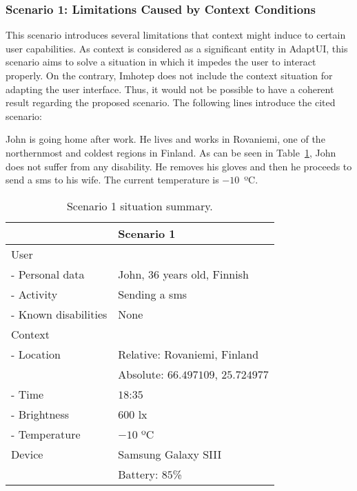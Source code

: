\subsubsection{Scenario 1: Limitations Caused by Context Conditions}
\label{sec:scenario1}

This scenario introduces several limitations that context might induce to 
certain user capabilities. As context is considered as a significant entity in 
AdaptUI, this scenario aims to solve a situation in which it impedes the user to
interact properly. On the contrary, Imhotep does not include the context 
situation for adapting the user interface. Thus, it would not be possible to 
have a coherent result regarding the proposed scenario. The following 
lines introduce the cited scenario:

John is going home after work. He lives and works in Rovaniemi, one of the
northernmost and coldest regions in Finland. As can be seen in 
Table~\ref{tbl:scenario1}, John does not suffer from any disability. He removes
his gloves and then he proceeds to send a \ac{sms} to his wife. The current 
temperature is $-10$~ºC.

\begin{table}
 \caption{Scenario 1 situation summary.}
 \label{tbl:scenario1}
 \footnotesize
 \centering
\begin{tabular}{l l}
  \hline 
				& \textbf{Scenario 1} 		\\
  \hline
  User \\
  \qquad - Personal data 	& John, $36$ years old, Finnish 	\\
  \qquad - Activity	 	& Sending a \ac{sms}		 	\\
  \qquad - Known disabilities 	& None			 	\\
  Context \\
  \qquad - Location 		& Relative: Rovaniemi, Finland	\\
				& Absolute: $66.497109$, $25.724977$\\
  \qquad - Time			& $18$:$35$				\\
  \qquad - Brightness		& $600$ \ac{lx}			\\
  \qquad - Temperature		& $-10$ ºC			\\
  Device 			& Samsung Galaxy SIII		\\
				& Battery: $85$\%			\\
  \hline
\end{tabular}
\end{table}

